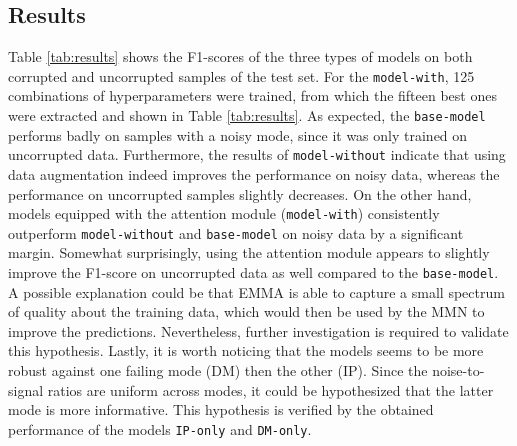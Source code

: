 \subsection{Results}
Table \ref{tab:results} shows the F1-scores of the three types of models on both corrupted and uncorrupted samples of the test set. For the \texttt{model-with}, 125 combinations of hyperparameters were trained, from which the fifteen best ones were extracted and shown in Table \ref{tab:results}. As expected, the \texttt{base-model} performs badly on samples with a noisy mode, since it was only trained on uncorrupted data. Furthermore, the results of \texttt{model-without} indicate that using data augmentation indeed improves the performance on noisy data, whereas the performance on uncorrupted samples slightly decreases. On the other hand, models equipped with the attention module (\texttt{model-with}) consistently outperform \texttt{model-without} and \texttt{base-model} on noisy data by a significant margin. Somewhat surprisingly, using the attention module appears to slightly improve the F1-score on uncorrupted data as well compared to the \texttt{base-model}. A possible explanation could be that EMMA is able to capture a small spectrum of quality about the training data, which would then be used by the MMN to improve the predictions. Nevertheless, further investigation is required to validate this hypothesis. Lastly, it is worth noticing that the models seems to be more robust against one failing mode (DM) then the other (IP). Since the noise-to-signal ratios are uniform across modes, it could be hypothesized that the latter mode is more informative. This hypothesis is verified by the obtained performance of the models \texttt{IP-only} and \texttt{DM-only}.
